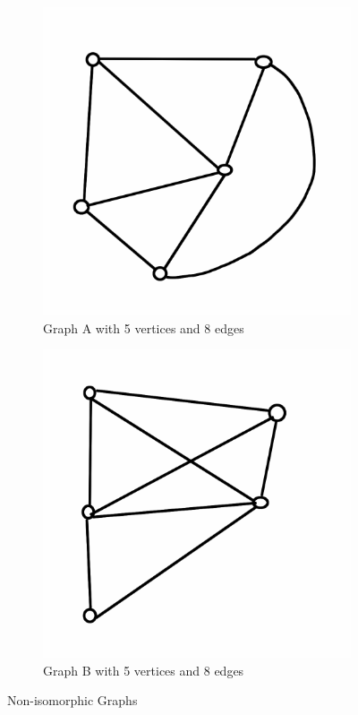 \documentclass[12pt,letterpaper]{article}
\theoremstyle{definition}
\begin{document}
\begin{figure}[h]
\centering
\begin{subfigure}[b]{0.4\textwidth}
\includegraphics[width=\textwidth]{images/tricolor.png}
\caption{Graph A with 5 vertices and 8 edges}
\label{fig:3color}
\end{subfigure}
\qquad
\begin{subfigure}[b]{0.4\textwidth}
\includegraphics[width=\textwidth]{images/4color.png}
\caption{Graph B with 5 vertices and 8 edges}
\label{fig:4color}
\end{subfigure}
\caption{Non-isomorphic Graphs}
\label{fig:noniso}
\end{figure}
\end{document}
